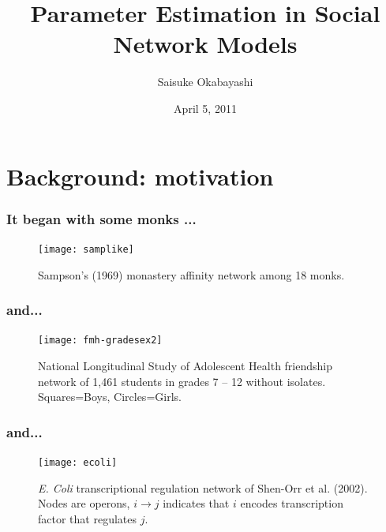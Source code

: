 \documentclass[ 10pt]{beamer}
\title{Parameter Estimation in Social Network Models}
\author{
  Saisuke Okabayashi 
}
\institute{Department of Statistics \\ University of Minnesota}
\date{April 5, 2011}
\begin{document}

\frame{\titlepage}
\section{Background: motivation}


\frame
{
  \frametitle{It began with some monks ...}
\begin{figure}
\begin{center} 
\texttt{[image: samplike]}
\caption{Sampson's (1969) monastery affinity network among 18 monks.} 
\end{center} 
\end{figure}
}
%
\frame
{
  \frametitle{and... }
\begin{figure}
\begin{center} 
\texttt{[image: fmh-gradesex2]}
\caption{National Longitudinal Study of Adolescent Health friendship network of 1,461 students in grades 7 -- 12 without isolates.  Squares=Boys, Circles=Girls.} 
\end{center} 
\label{fmh} 
\end{figure}
}
\frame
{
  \frametitle{and...}

\begin{figure}
\begin{center} 
\texttt{[image: ecoli]}
\caption{\textit{E. Coli} transcriptional regulation network of Shen-Orr et al. (2002).  
Nodes are operons, $i \to j$ indicates that $i$ encodes transcription factor that regulates $j$.} 
\end{center} 
\end{figure}
}
\end{document}
